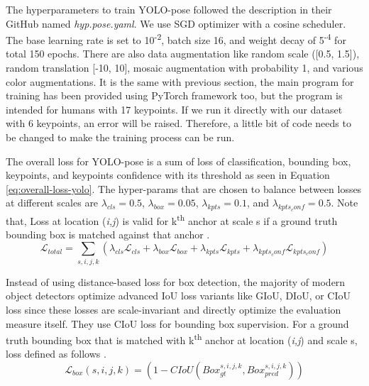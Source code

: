 



The hyperparameters to train YOLO-pose followed the description in their GitHub named \emph{hyp.pose.yaml}.
We use SGD optimizer with a cosine scheduler. The base learning rate is set to 10\textsuperscript{-2}, batch size 16,
and weight decay of 5\textsuperscript{-4} for total 150 epochs. There are also data augmentation like random scale ([0.5, 1.5]),
random translation [-10, 10], mosaic augmentation with probability 1, and various color augmentations.
It is the same with previous section, the main program for training has been provided using PyTorch framework too, but the program is intended for humans with 17 keypoints.
If we run it directly with our dataset with 6 keypoints, an error will be raised. Therefore, a little bit of code needs to be changed to make the training process can be run.

The overall loss for YOLO-pose is a sum of loss of classification, bounding box, keypoints, and keypoints confidence with its threshold as seen in Equation \ref{eq:overall-loss-yolo}.
The hyper-params that are chosen to balance between losses at different scales are $\lambda_{cls} = 0.5$, $\lambda_{box} = 0.05$, $\lambda_{kpts} = 0.1$, and $\lambda_{kpts_conf} = 0.5$.
Note that, Loss at location (\emph{i,j}) is valid for k\textsuperscript{th} anchor at scale s if a ground truth bounding box is matched against that anchor \parencite{maji2022yolopose}.
\begin{equation}
  \label{eq:overall-loss-yolo}
  \mathcal{L}_{total} = \sum_{s,i,j,k} (\lambda_{cls}\mathcal{L}_{cls} + \lambda_{box}\mathcal{L}_{box} + \lambda_{kpts}\mathcal{L}_{kpts} + \lambda_{kpts_conf}\mathcal{L}_{kpts_conf})
\end{equation}

Instead of using distance-based loss for box detection, the majority of modern object detectors optimize advanced IoU loss variants like GIoU, DIoU, or CIoU loss since these losses are scale-invariant and directly optimize the evaluation measure itself.
They use CIoU loss for bounding box supervision. For a ground truth bounding box that is matched with k\textsuperscript{th} anchor at location (\emph{i,j}) and scale s, loss defined as follows \parencite{maji2022yolopose}.
\begin{equation}
  \label{eq:bbox-loss-yolo}
  \mathcal{L}_{box}(s,i,j,k) = (1 - CIoU(Box_{gt}^{s,i,j,k}, Box_{pred}^{s,i,j,k}))
\end{equation}

